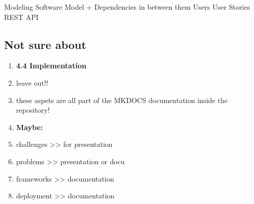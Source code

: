 \clearpage

\label{sec:implementation:modeling}

Modeling
	Software Model
	+ Dependencies in between them
	Users
	User Stories
	REST API








% 

\subsection{Not sure about}

	\begin{enumerate}

	\item \textbf{4.4 Implementation}
		\item leave out!!
		\item these aspets are all part of the MKDOCS documentation inside the repository!

	\item \textbf{Maybe:}
		\item challenges		>> for presentation
		\item problems		>> presentation or docu
		\item frameworks 		>> documentation
		\item deployment		>> documentation

	\end{enumerate}
